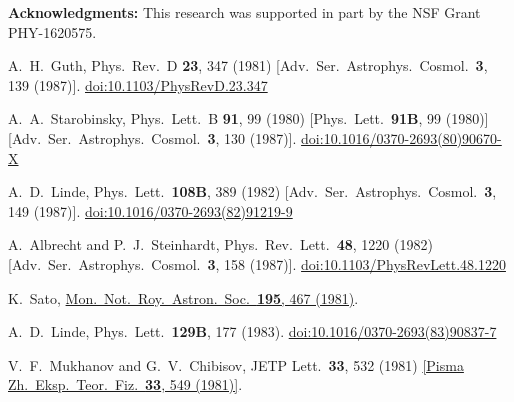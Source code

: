 \documentclass[12pt]{article}
\newcommand{\rr}[1]{{\color{red}{#1}}}
\begin{document}
\textbf{Acknowledgments:}
\rr{Conversations with James Halverson and Cody Long are acknowledged.}
This research was supported in part by the NSF Grant PHY-1620575.

\clearpage

\begin{thebibliography}{99}
  A.~H.~Guth,
  Phys.\ Rev.\ D {\bf 23}, 347 (1981)
  [Adv.\ Ser.\ Astrophys.\ Cosmol.\  {\bf 3}, 139 (1987)].
  \href{https://dx.doi.org/10.1103/PhysRevD.23.347}{doi:10.1103/PhysRevD.23.347}

  A.~A.~Starobinsky,
  Phys.\ Lett.\ B {\bf 91}, 99 (1980)
  [Phys.\ Lett.\  {\bf 91B}, 99 (1980)]
  [Adv.\ Ser.\ Astrophys.\ Cosmol.\  {\bf 3}, 130 (1987)].
  \href{https://dx.doi.org/10.1016/0370-2693(80)90670-X}{doi:10.1016/0370-2693(80)90670-X}

  A.~D.~Linde,
  Phys.\ Lett.\  {\bf 108B}, 389 (1982)
  [Adv.\ Ser.\ Astrophys.\ Cosmol.\  {\bf 3}, 149 (1987)].
  \href{https://dx.doi.org/10.1016/0370-2693(82)91219-9}{doi:10.1016/0370-2693(82)91219-9}

  A.~Albrecht and P.~J.~Steinhardt,
  Phys.\ Rev.\ Lett.\  {\bf 48}, 1220 (1982)
  [Adv.\ Ser.\ Astrophys.\ Cosmol.\  {\bf 3}, 158 (1987)].
  \href{https://dx.doi.org/10.1103/PhysRevLett.48.1220}{doi:10.1103/PhysRevLett.48.1220}

  K.~Sato,
  \href{http://articles.adsabs.harvard.edu/full/1981MNRAS.195..467S}{Mon.\ Not.\ Roy.\ Astron.\ Soc.\  {\bf 195}, 467 (1981)}.

  A.~D.~Linde,
  Phys.\ Lett.\  {\bf 129B}, 177 (1983).
  \href{https://dx.doi.org/10.1016/0370-2693(83)90837-7}{doi:10.1016/0370-2693(83)90837-7}

  V.~F.~Mukhanov and G.~V.~Chibisov,
  JETP Lett.\  {\bf 33}, 532 (1981)
  \href{http://inspirehep.net/record/170051/files/article_23079.pdf?version=1}{[Pisma Zh.\ Eksp.\ Teor.\ Fiz.\  {\bf 33}, 549 (1981)]}.


\end{thebibliography}
\end{document}
